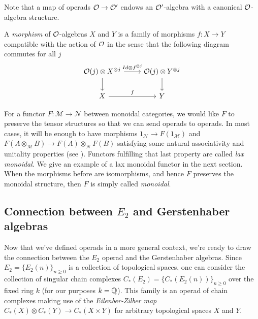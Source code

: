 \documentclass[TFM.tex]{subfiles}
\begin{document}
Note that a map of operads ${\mathcal O}\to {\mathcal O}'$ endows an ${\mathcal O}'$-algebra with a canonical ${\mathcal O}$-algebra structure.

\begin{defi}
	A \emph{morphism} of ${\mathcal O}$-algebras $X$ and $Y$ is a family of morphisms $f:X\to Y$ compatible with the action of ${\mathcal O}$ in the sense that the following diagram commutes for all $j$
	\[
	\begin{tikzcd}
	\OO(j)\otimes X^{\otimes j}\arrow[r, "Id\otimes f^{\otimes j}"]\arrow[d] & 	\OO(j)\otimes Y^{\otimes j}\arrow[d]\\
	X\arrow[r, "f"] & Y
	\end{tikzcd}
	\]
	\end{defi}


For a functor $F:\mathscr{M}\to\mathscr{N}$ between monoidal categories, we would like $F$ to preserve the tensor structures so that we can send operads to operads. In most cases, it will be enough to have  morphisms $1_{\mathscr{N}}\to F(1_\mathscr{M})$ and $F(A\otimes_{\mathscr{M}}B)\to F(A)\otimes_{\mathscr{N}} F(B)$ satisfying some natural associativity and unitality properties (see \cite[Definition 6.4.1]{handbook}). Functors fulfilling that last property are called \emph{lax monoidal}. We give an example of a lax monoidal functor in the next section. When the morphisms before are isomorphisms, and hence $F$ preserves the monoidal structure, then $F$ is simply called \emph{monoidal}.

\subsection{Connection between $E_2$ and Gerstenhaber algebras}\label{zilber}

Now that we've defined operads in a more general context, we're ready to draw the connection between the $E_2$ operad and the Gerstenhaber algebras. Since $E_2=\{E_2(n)\}_{n\geq 0}$ is a collection of topological spaces, one can consider the collection of singular chain complexes $C_*(E_2)=\{C_*(E_2(n))\}_{n\geq 0}$ over the fixed ring $k$ (for our purposes $k=\mathbb{Q}$). This family is an operad of chain complexes making use of the \emph{Eilenber-Zilber map} \cite{EZ} $C_*(X)\otimes C_*(Y)\to C_*(X\times Y)$ for arbitrary topological spaces $X$ and $Y$. 
\end{document}
